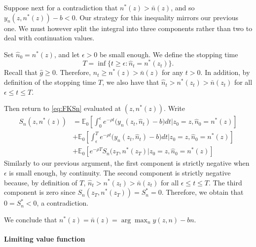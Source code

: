 Suppose next for a contradiction that $n^*(z) > \bar{n}(z)$, and so $y_n(z,n^*(z)) - b < 0$. Our strategy for this inequality mirrors our previous one. We must however split the integral into three components rather than two to deal with continuation values.

Set $\hat{n}_0 = n^*(z)$, and let $\epsilon > 0$ be small enough. We define the stopping time
\[
T = \inf\{ t \geq \epsilon : \hat{n}_t = n^*(z_t) \}.
\]
Recall that $\hat{g} \geq 0$. Therefore, $\hat{n}_t \geq n^*(z) > \bar{n}(z)$ for any $t > 0$. In addition, by definition of the stopping time $T$, we also have that $\hat{n}_t > n^*(z_t) > \bar{n}(z_t)$ for all $\epsilon \leq t \leq T$.

Then return to \eqref{eq:FKSn} evaluated at $(z,n^*(z))$. Write
\begin{align*}
S_n(z,n^*(z)) &= \mathbb{E}_0 \left[ \int_0^\epsilon e^{-\rho t} \big(y_n(z_t,\hat{n}_t) - b \big) dt \Bigg| z_0 = z , \hat{n}_0 = n^*(z) \right]  \\
&+ \mathbb{E}_0 \left[ \int_\epsilon^T e^{-\rho t} \big(y_n(z_t,\hat{n}_t) - b \big) dt \Bigg| z_0 = z , \hat{n}_0 = n^*(z) \right] \\
&+  \mathbb{E}_0 \left[e^{-\rho T} S_n(z_T,n^*(z_T) \Bigg| z_0 = z , \hat{n}_0 = n^*(z) \right]
\end{align*}
Similarly to our previous argument, the first component is strictly negative when $\epsilon$ is small enough, by continuity. The second component is strictly negative because, by definition of $T$, $\hat{n}_t > n^*(z_t) > \bar{n}(z_t)$ for all $\epsilon \leq t \leq T$. The third component is zero since $S_n(z_T,n^*(z_T)) = S_n^* = 0$. Therefore, we obtain that $0 = S_n^* < 0$, a contradiction.

We conclude that $n^*(z) = \bar{n}(z) = \arg\max_{n} y(z,n) - bn$.

\paragraph{Limiting value function}

